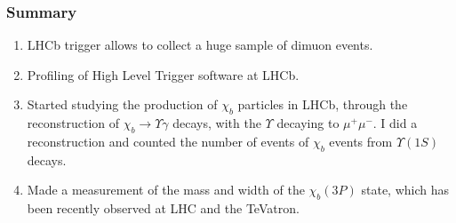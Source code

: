 \documentclass{beamer}
\begin{document}
\begin{frame}
\frametitle{Summary}
\begin{enumerate}
\item LHCb trigger allows to collect a huge sample of dimuon events.
\item Profiling of High Level Trigger software at LHCb.
\item Started studying the production of $\chi_b$ particles in LHCb, through the reconstruction of $\chi_b \rightarrow \Upsilon \gamma$ decays, with the $\Upsilon$ decaying to $\mu^+ \mu^-$.
I did a reconstruction and counted the number of events of $\chi_b$ events from $\Upsilon(1S)$ decays.
\item Made a  measurement of the mass and width of the $\chi_b(3P)$ state, which has been recently observed at LHC and the TeVatron.
\end{enumerate}
\end{frame}



\end{document}
